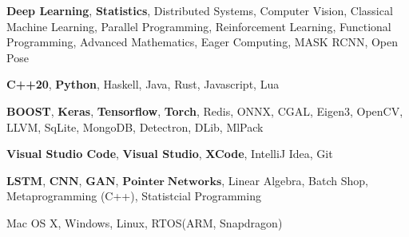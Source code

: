 %
%
%


	\begin{keywords}
		
			{
				\textbf{Deep Learning}, 
				\textbf{Statistics},
				Distributed Systems,
				Computer Vision,
				Classical Machine Learning,
				Parallel Programming,
				Reinforcement Learning,
				Functional Programming,
				Advanced Mathematics,
				Eager Computing,
				MASK RCNN,
				Open Pose
			}
				
			{
				\textbf{C++20}, 
				\textbf{Python},
				 Haskell, 
				 Java, 
				 Rust, 
				 Javascript,
				 Lua
			}
			
			{
				\textbf{BOOST},
				\textbf{Keras},
				\textbf{Tensorflow}, 
				\textbf{Torch},
				Redis,
				ONNX,
				CGAL, 
				Eigen3, 
				OpenCV,
				LLVM,
				SqLite,
				MongoDB,
				Detectron,
				DLib,
				MlPack
			}
		
			{
				\textbf{Visual Studio Code},
				\textbf{Visual Studio}, 
				\textbf{XCode},
				IntelliJ Idea, 
				Git
			}
		
		{
			$\mathbf{LSTM}$, $\mathbf{CNN}$, $\mathbf{GAN}$, 
			$\mathbf{Pointer \;Networks}$, Linear Algebra, Batch Shop, Metaprogramming (C++), Statistcial Programming
		}		
				
			{
				Mac OS X, 
				Windows, 
				Linux,
				RTOS(ARM, Snapdragon)
			}
	\end{keywords}